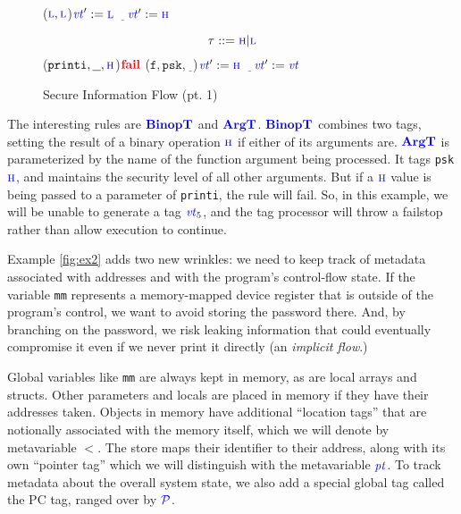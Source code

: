 \documentclass{llncs}
\begin{document}
\begin{figure}
  \begin{minipage}{0.5\textwidth}
    \consttruleblock{\(\vt := \low\)}
    \localtruleblock{\(\vt := \low\)}

    \binoptruleblock
        {
          {(\(\textnormal{\color{blue} \sc l},\textnormal{\color{blue} \sc l}\))}{\(\mathit{\color{blue} vt}':=\textnormal{\color{blue} \sc l}\)}
          {\(\underline{~~~}\)}{\(\mathit{\color{blue} vt}':=\textnormal{\color{blue} \sc h}\)}}
  \end{minipage}
  \begin{minipage}{0.4\textwidth}
    \[\tau::=\textnormal{\color{blue} \sc h} | \textnormal{\color{blue} \sc l}\]
    \argtruleblock
        {
          {(\(\mathtt{printi},\underline{~~},\textnormal{\color{blue} \sc h}\))}{\(\mathbf{\color{red} fail}\)}
          {(\(\mathtt{f},\mathtt{psk},\underline{~~}\))}{\(\mathit{\color{blue} vt}':=\textnormal{\color{blue} \sc h}\)}
          {\(\underline{~~~}\)}{\(\mathit{\color{blue} vt}':=\mathit{\color{blue} vt}\)}}
  \end{minipage}

  \caption{Secure Information Flow (pt. 1)}
  \label{fig:example1rules}
\end{figure}

The interesting rules are \(\color{blue} \mathbf{BinopT}\) and \(\color{blue} \mathbf{ArgT}\). \(\color{blue} \mathbf{BinopT}\)
combines two tags, setting the result of a binary operation \(\textnormal{\color{blue} \sc h}\) if either of its arguments are.
\(\color{blue} \mathbf{ArgT}\) is parameterized by the name of the function argument being processed.
It tags {\tt psk} \(\textnormal{\color{blue} \sc h}\), and maintains the security level of all other arguments.
But if a \(\textnormal{\color{blue} \sc h}\) value is being passed to a parameter of {\tt printi}, the rule will fail.
So, in this example, we will be unable to generate a tag
\(\mathit{\color{blue} vt}_5\), and the tag processor will throw a failstop rather than allow execution to continue.

Example \ref{fig:ex2} adds two new wrinkles: we need to keep track of metadata associated with
addresses and with the program's control-flow state. If the variable {\tt mm} represents
a memory-mapped device register that is outside of the program's control, we want to avoid storing the password there. And, by
branching on the password, we risk leaking information that could eventually compromise it even
if we never print it directly (an {\em implicit flow}.)

Global variables like {\tt mm} are always kept in memory, as are local arrays and structs.
Other parameters and locals are placed in memory if they have their addresses taken.
Objects in memory have additional ``location tags'' that are notionally associated with the memory
itself, which we will denote by metavariable \(\lt\). The store maps their identifier
to their address, along with its own ``pointer tag'' which we will distinguish with the
metavariable \(\mathit{\color{blue} pt}\). To track metadata about the overall system state, we also add
a special global tag called the PC tag, ranged over by \(\mathcal{\color{blue} P\mathit{}}\).
\end{document}
